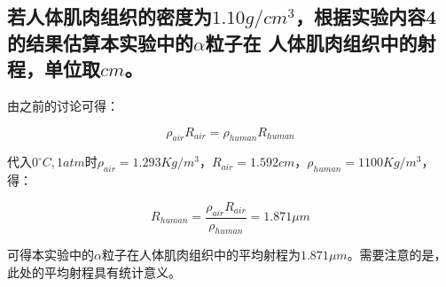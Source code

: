 \documentclass[a4paper,UTF8]{ctexart}
\begin{document}
\subsection{若人体肌肉组织的密度为$1.10g/cm^3$，根据实验内容4的结果估算本实验中的$\alpha$粒子在
人体肌肉组织中的射程，单位取$cm$。}

由之前的讨论可得：

\begin{equation}
    \rho_{air} R_{air} = \rho_{human} R_{human} 
\end{equation}

代入$0^{\circ}C, 1 atm$时$\rho_{air} = 1.293 Kg/m^3$，$R_{air} = 1.592cm$，$\rho_{human} = 1100 Kg/m^3$，得：

\begin{equation}
    R_{human} = \frac{\rho_{air}R_{air}}{\rho_{human}} = 1.871 \mu m
\end{equation}

可得本实验中的$\alpha$粒子在人体肌肉组织中的平均射程为$1.871 \mu m$。需要注意的是，此处的平均射程具有统计意义。
\end{document}
